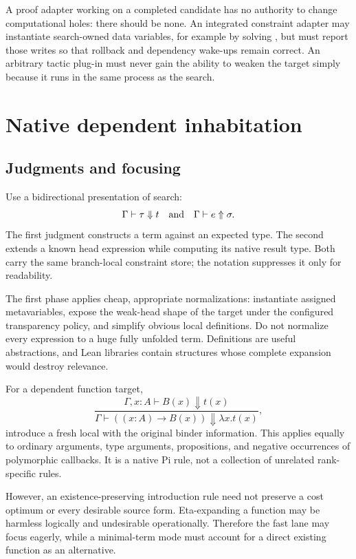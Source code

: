 \documentclass[11pt,a4paper]{article}
\newcommand{\code}[1]{\texttt{\detokenize{#1}}}
\theoremstyle{remark}
\begin{document}
A proof adapter working on a completed candidate has no authority to change computational holes: there should be none. An integrated constraint adapter may instantiate search-owned data variables, for example by solving \code{?n = 2}, but must report those writes so that rollback and dependency wake-ups remain correct. An arbitrary tactic plug-in must never gain the ability to weaken the target simply because it runs in the same process as the search.

\section{Native dependent inhabitation}\label{sec:inhabitation}

\subsection{Judgments and focusing}

Use a bidirectional presentation of search:
\[
 \Gamma\vdash \tau\Downarrow t
 \quad\hbox{and}\quad
 \Gamma\vdash e\Uparrow\sigma.
\]
The first judgment constructs a term against an expected type. The second extends a known head expression while computing its native result type. Both carry the same branch-local constraint store; the notation suppresses it only for readability.

The first phase applies cheap, appropriate normalizations: instantiate assigned metavariables, expose the weak-head shape of the target under the configured transparency policy, and simplify obvious local definitions. Do not normalize every expression to a huge fully unfolded term. Definitions are useful abstractions, and Lean libraries contain structures whose complete expansion would destroy relevance.

For a dependent function target,
\[
 \frac{\Gamma,x:A\vdash B(x)\Downarrow t(x)}
      {\Gamma\vdash ((x:A)\to B(x))\Downarrow\lambda x.t(x)},
\]
introduce a fresh local with the original binder information. This applies equally to ordinary arguments, type arguments, propositions, and negative occurrences of polymorphic callbacks. It is a native Pi rule, not a collection of unrelated rank-specific rules.

However, an existence-preserving introduction rule need not preserve a cost optimum or every desirable source form. Eta-expanding a function may be harmless logically and undesirable operationally. Therefore the fast lane may focus eagerly, while a minimal-term mode must account for a direct existing function as an alternative.
\end{document}
